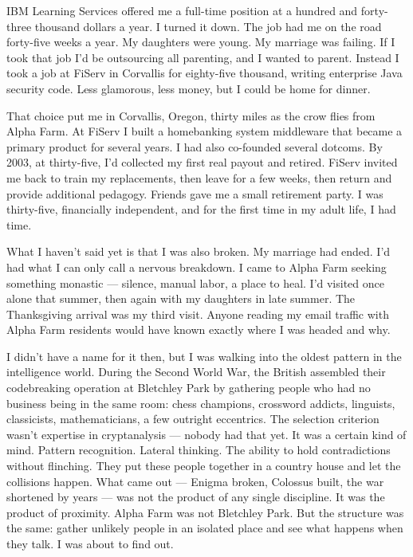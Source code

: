 IBM Learning Services offered me a full-time position at a hundred and forty-three thousand dollars a year. I turned it down. The job had me on the road forty-five weeks a year. My daughters were young. My marriage was failing. If I took that job I'd be outsourcing all parenting, and I wanted to parent. Instead I took a job at FiServ in Corvallis for eighty-five thousand, writing enterprise Java security code. Less glamorous, less money, but I could be home for dinner.

That choice put me in Corvallis, Oregon, thirty miles as the crow flies from Alpha Farm. At FiServ I built a homebanking system middleware that became a primary product for several years. I had also co-founded several dotcoms. By 2003, at thirty-five, I'd collected my first real payout and retired. FiServ invited me back to train my replacements, then leave for a few weeks, then return and provide additional pedagogy. Friends gave me a small retirement party. I was thirty-five, financially independent, and for the first time in my adult life, I had time.

What I haven't said yet is that I was also broken. My marriage had ended. I'd had what I can only call a nervous breakdown. I came to Alpha Farm seeking something monastic --- silence, manual labor, a place to heal. I'd visited once alone that summer, then again with my daughters in late summer. The Thanksgiving arrival was my third visit. Anyone reading my email traffic with Alpha Farm residents would have known exactly where I was headed and why.

I didn't have a name for it then, but I was walking into the oldest pattern in the intelligence world. During the Second World War, the British assembled their codebreaking operation at Bletchley Park by gathering people who had no business being in the same room: chess champions, crossword addicts, linguists, classicists, mathematicians, a few outright eccentrics. The selection criterion wasn't expertise in cryptanalysis --- nobody had that yet. It was a certain kind of mind. Pattern recognition. Lateral thinking. The ability to hold contradictions without flinching. They put these people together in a country house and let the collisions happen. What came out --- Enigma broken, Colossus built, the war shortened by years --- was not the product of any single discipline. It was the product of proximity. Alpha Farm was not Bletchley Park. But the structure was the same: gather unlikely people in an isolated place and see what happens when they talk. I was about to find out.

